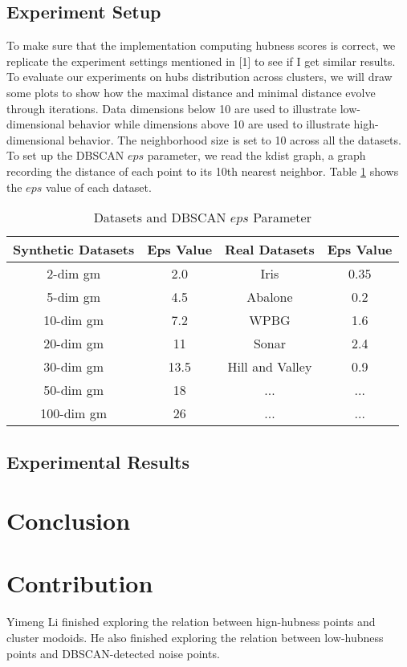 \documentclass[11pt]{article}
\begin{document}
\subsection{Experiment Setup}
To make sure that the implementation computing hubness scores is correct, we replicate the experiment settings mentioned in [1] to see if I get similar results.\\
To evaluate our experiments on hubs distribution across clusters, we will draw some plots to show how the maximal distance and minimal distance evolve through iterations. Data dimensions below 10 are used to illustrate low-dimensional behavior while dimensions above 10 are used to illustrate high-dimensional behavior. The neighborhood size is set to 10 across all the datasets.\\
To set up the DBSCAN $eps$ parameter, we read the kdist graph, a graph recording the distance of each point to its 10th nearest neighbor. Table \ref{exp-setup} shows the $eps$ value of each dataset.
\begin{table}
\begin{center}
	\begin{tabular}{||c c c c||}
	\hline
	Synthetic Datasets & Eps Value & Real Datasets & Eps Value\\[0.5ex]
	\hline
	2-dim gm & 2.0 & Iris & 0.35\\
	\hline
	5-dim gm & 4.5 & Abalone & 0.2\\
	\hline
	10-dim gm & 7.2 & WPBG & 1.6\\
	\hline
	20-dim gm & 11 & Sonar & 2.4\\
	\hline
	30-dim gm & 13.5 & Hill and Valley & 0.9\\
	\hline
	50-dim gm & 18 & ... & ...\\
	\hline
	100-dim gm & 26 & ... & ...\\
	\hline
\end{tabular}
\caption{Datasets and DBSCAN $eps$ Parameter}
\end{center}
\label{exp-setup}
\end{table} 

\subsection{Experimental Results}



\section{Conclusion}

\section{Contribution}
Yimeng Li finished exploring the relation between hign-hubness points and cluster modoids. He also finished exploring the relation between low-hubness points and DBSCAN-detected noise points.


\end{document}
